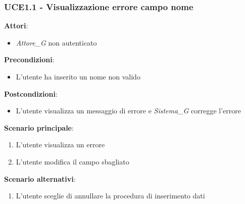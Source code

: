\subsubsection{UCE1.1 - Visualizzazione errore campo nome}
\textbf{Attori}:
\begin{itemize}
    \item \textit{Attore_G} non autenticato
\end{itemize}
\textbf{Precondizioni}:
\begin{itemize}
    \item L'utente ha inserito un nome non valido
\end{itemize}
\textbf{Postcondizioni}:
\begin{itemize}
    \item L'utente visualizza un messaggio di errore e \textit{Sistema_G} corregge l'errore
\end{itemize}
\textbf{Scenario principale}:
\begin{enumerate}
    \item L'utente visualizza un errore 
    \item L'utente modifica il campo sbagliato
\end{enumerate}
\textbf{Scenario alternativi}:
\begin{enumerate}
    \item L'utente sceglie di annullare la procedura di inserimento dati
\end{enumerate}